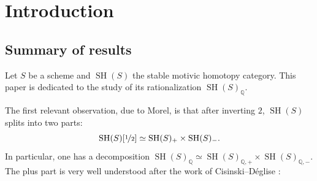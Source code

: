 \documentclass[11pt]{article}
\numberwithin{equation}{section}\renewcommand{\encodingdefault}{TU}
\DeclareMathOperator{\SH}{SH}
\newcommand{\ot} {{\nicefrac 1 2}}
\newcommand{\QQ} {\mathbb Q}
\theoremstyle{remark}
\theoremstyle{definition}
\numberwithin{equation}{thm}
\begin{document}
\section{Introduction}

\subsection*{Summary of results}

Let $S$ be a scheme and $\SH(S)$ the stable motivic homotopy category.
This paper is dedicated to the study of its rationalization $\SH(S)_\QQ$.

The first relevant observation, due to Morel, is that after inverting $2$, $\SH(S)$ splits into two parts:
\[
\SH(S)[\ot] \simeq \SH(S)_+ \times \SH(S)_-.
\]
In particular, one has a decomposition $\SH(S)_\QQ \simeq \SH(S)_{\QQ,+}\times \SH(S)_{\QQ,-}$.
The plus part is very well understood after the work of Cisinski--Déglise \cite{CD3}:
\end{document}
